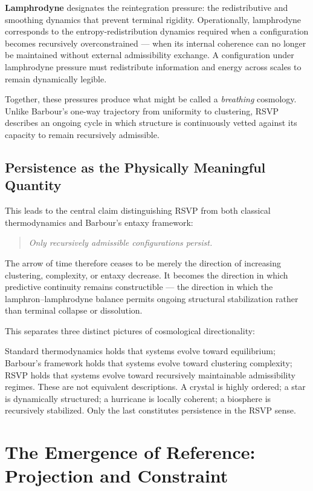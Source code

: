 \documentclass[12pt, a4paper]{article}
\begin{document}
\textbf{Lamphrodyne} designates the reintegration pressure: the
redistributive and smoothing dynamics that prevent terminal rigidity.
Operationally, lamphrodyne corresponds to the entropy-redistribution
dynamics required when a configuration becomes recursively overconstrained
— when its internal coherence can no longer be maintained without external
admissibility exchange. A configuration under lamphrodyne pressure must
redistribute information and energy across scales to remain dynamically
legible.

Together, these pressures produce what might be called a \emph{breathing}
cosmology. Unlike Barbour's one-way trajectory from uniformity to
clustering, RSVP describes an ongoing cycle in which structure is
continuously vetted against its capacity to remain recursively admissible.

\subsection{Persistence as the Physically Meaningful Quantity}

This leads to the central claim distinguishing RSVP from both classical
thermodynamics and Barbour's entaxy framework:

\begin{quote}
\itshape
Only recursively admissible configurations persist.
\end{quote}

The arrow of time therefore ceases to be merely the direction of increasing
clustering, complexity, or entaxy decrease. It becomes the direction in
which predictive continuity remains constructible — the direction in which
the lamphron–lamphrodyne balance permits ongoing structural stabilization
rather than terminal collapse or dissolution.

This separates three distinct pictures of cosmological directionality:

Standard thermodynamics holds that systems evolve toward equilibrium;
Barbour's framework holds that systems evolve toward clustering complexity;
RSVP holds that systems evolve toward recursively maintainable admissibility
regimes. These are not equivalent descriptions. A crystal is highly ordered; a star
is dynamically structured; a hurricane is locally coherent; a biosphere is
recursively stabilized. Only the last constitutes persistence in the RSVP
sense.

\section{The Emergence of Reference: Projection and Constraint}
\end{document}
